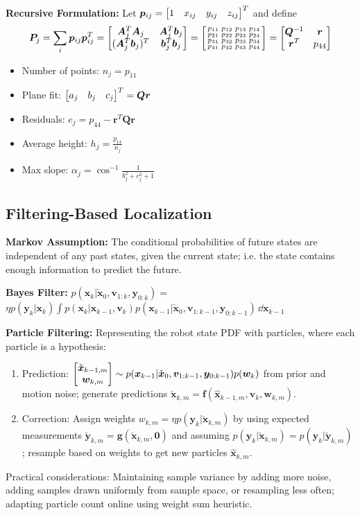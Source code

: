 \documentclass[twocolumn, 8pt]{extarticle}
\begin{document}
\textbf{Recursive Formulation:} Let \(\bm p_{ij} = \rvec{1}{x_{ij}}{y_{ij}}{z_{ij}}^T\) and define
\[
\bm P_j = \sum _i \bm p_{ij}\bm p_{ij}^T = \mattwo{\bm A_j^T\bm A_j}{\bm A_j^T\bm b_j}{(\bm A_j^T\bm b_j)^T}{\bm b_j^T\bm b_j}
= \matfour[bsmall]{p_{11}}{p_{12}}{p_{13}}{p_{14}}{p_{21}}{p_{22}}{p_{23}}{p_{24}}{p_{31}}{p_{32}}{p_{33}}{p_{34}}{p_{41}}{p_{42}}{p_{43}}{p_{44}}
= \mattwo{\bm Q^{-1}}{\bm r}{\bm r^T}{p_{44}}
\]
\begin{itemize}
  \item Number of points: $n_j = p_{11}$
  \item Plane fit: \(\rvec{a_j}{b_j}{c_j}^T = \bm Q\bm r\)
  \item Residuals: \(e_j = p_{44} - \bm r^T\bm Q\bm r\)
	\item Average height: $h_j = \frac{p_{14}}{n_j}$
	\item Max slope: $\alpha _j = \cos^{-1}\frac{1}{b_j^2 + c_j^2 + 1}$
\end{itemize}

\subsection{Filtering-Based Localization}

\textbf{Markov Assumption:} The conditional probabilities of future states are independent of any past states, given the
current state; i.e. the state contains enough information to predict the future.

\textbf{Bayes Filter:} \(\displaystyle p(\bm x_k | \check{\bm x}_0, \bm v_{1:k}, \bm y_{0:k}) =\)\\
\(\displaystyle \eta p(\bm y_k | \bm x_k)\int p(\bm x_k | \bm x_{k - 1}, \bm v_k)p(\bm x_{k - 1} | \check{\bm x}_0, \bm v_{1:k - 1}, \bm y_{0:k - 1})\,\dd\bm x_{k - 1}\)

\textbf{Particle Filtering:} Representing the robot state PDF with particles, where each particle is a hypothesis:
\begin{enumerate}
  \item Prediction: $\cvec{\check{\bm x}_{k - 1, m}}{\bm w_{k, m}} \sim p(\bm x_{k - 1} | \check{\bm x}_0, \bm v_{1:k - 1}, \bm y_{0:k - 1})p(\bm w_k)$
        from prior and motion noise; generate predictions \(\check{\bm x}_{k, m} = \bm f(\hat{\bm x}_{k - 1, m}, \bm v_k, \bm w_{k, m})\).
  \item Correction: Assign weights $w_{k, m} = \eta p(\bm y_k | \check{\bm x}_{k, m})$ by using expected measurements
        $\check{\bm y}_{k, m} = \bm g(\check{\bm x}_{k, m}, \bm 0)$ and assuming $p(\bm y_k | \check{\bm x}_{k, m}) = p(\bm y_k | \check{\bm y}_{k, m})$;
        resample based on weights to get new particles \(\hat{\bm x}_{k, m}\).
\end{enumerate}
Practical considerations: Maintaining sample variance by adding more noise, adding samples drawn uniformly from sample
space, or resampling less often; adapting particle count online using weight sum heuristic.
\end{document}
